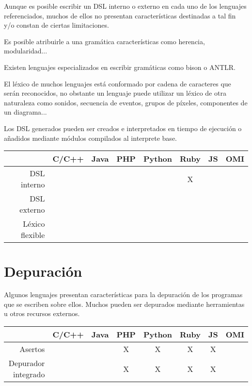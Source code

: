Aunque es posible escribir un DSL interno o externo en cada uno de los lenguajes referenciados,
muchos de ellos no presentan características destinadas a tal fin y/o constan de ciertas limitaciones.

Es posible atribuirle a una gramática características como herencia, modularidad...

Existen lenguajes especializados en escribir gramáticas como bison o ANTLR.

El léxico de muchos lenguajes está conformado por cadena de caracteres que serán reconocidos,
no obstante un lenguaje puede utilizar un léxico de otra naturaleza como sonidos,
secuencia de eventos, grupos de píxeles, componentes de un diagrama...

Los DSL generados pueden ser creados e interpretados en tiempo de ejecución o añadidos
mediante módulos compilados al interprete base.

\FloatBarrier
\begin{table}[h]
\begin{center}
 
\begin{tabular}{|r|c|c|c|c|c|c|c|} \hline
 & C/C++ & Java & PHP  & Python & Ruby & JS & OMI\\ \hline
DSL interno & & &  &  &  X &   &  \\ \hline
DSL externo & & &  &  &  &  &  \\ \hline
Léxico flexible & & &  &  &  &  &  \\ \hline
\end{tabular}
\end{center}
\end{table}
\FloatBarrier

\section{Depuración}
Algunos lenguajes presentan características para la depuración de los programas que se escriben 
sobre ellos. Muchos pueden ser depurados mediante herramientas u otros recursos 
externos. 

\FloatBarrier
\begin{table}[h]
\begin{center}
 
\begin{tabular}{|r|c|c|c|c|c|c|c|} \hline
 & C/C++ & Java & PHP  & Python & Ruby & JS & OMI\\ \hline
Asertos   & & & X & X &  X & X  &  \\ \hline
Depurador integrado & & & X & X & X & X &  \\ \hline
\end{tabular}
\end{center}
\end{table}
\FloatBarrier


